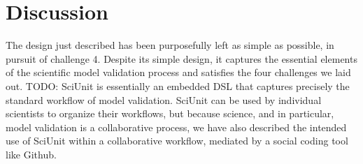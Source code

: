 \documentclass[9pt]{sig-alternate}
\newcommand{\verbx}[1]{\lstinline{#1}}
\begin{document}
%

 
\section{Discussion}\label{discussion}
The design just described has been purposefully left as simple as possible, in pursuit of challenge 4. Despite its simple design, it captures the essential elements of the scientific model validation process and satisfies the four challenges we laid out. TODO: SciUnit is essentially an embedded DSL that captures precisely the standard workflow of model validation. SciUnit can be used by individual scientists to organize their workflows, but because science, and in particular, model validation is a collaborative process, we have also described the intended use of SciUnit within a collaborative workflow, mediated by a social coding tool like Github. 

\end{document}
